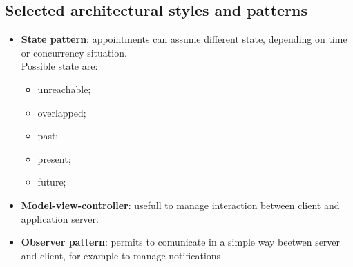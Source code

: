 \subsection{Selected architectural styles and patterns}
\begin{itemize}
	\item \textbf{State pattern}: appointments can assume different state, depending on time or concurrency situation.\\ Possible state are: 
		\begin{itemize}
			\item unreachable;
			\item overlapped;
			\item past;
			\item present;
			\item future;
		\end{itemize}
	\item \textbf{Model-view-controller}: usefull to manage interaction between client and application server.
	\item \textbf{Observer pattern}: permits to comunicate in a simple way beetwen server and client, for example to manage notifications
	
\end{itemize}
